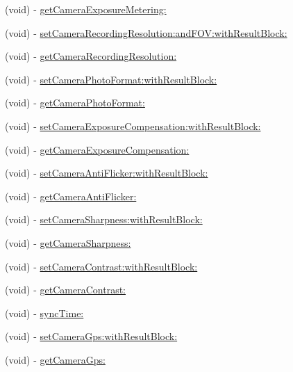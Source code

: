 \begin{DoxyCompactItemize}
\item 
(void) -\/ \hyperlink{interface_d_j_i_camera_a2bf7db98f17444eb1237a3e15876dbc9}{get\+Camera\+Exposure\+Metering\+:}
\item 
(void) -\/ \hyperlink{interface_d_j_i_camera_ab31e7fceb02ab8297592c0237178c124}{set\+Camera\+Recording\+Resolution\+:and\+F\+O\+V\+:with\+Result\+Block\+:}
\item 
(void) -\/ \hyperlink{interface_d_j_i_camera_abf7a4e534fca76520b6b7723b267b33c}{get\+Camera\+Recording\+Resolution\+:}
\item 
(void) -\/ \hyperlink{interface_d_j_i_camera_a866646cab142e602d5c41074c7931b26}{set\+Camera\+Photo\+Format\+:with\+Result\+Block\+:}
\item 
(void) -\/ \hyperlink{interface_d_j_i_camera_aacb8e2260944d9bc5d02840dbd98952f}{get\+Camera\+Photo\+Format\+:}
\item 
(void) -\/ \hyperlink{interface_d_j_i_camera_a6755ae71cfba5edd7ead0132d2e8b32a}{set\+Camera\+Exposure\+Compensation\+:with\+Result\+Block\+:}
\item 
(void) -\/ \hyperlink{interface_d_j_i_camera_a8ac02ef272b0748ae0b9ba0606cf1ff5}{get\+Camera\+Exposure\+Compensation\+:}
\item 
(void) -\/ \hyperlink{interface_d_j_i_camera_a6de121d0c2f5380a3f981ab58fd3d039}{set\+Camera\+Anti\+Flicker\+:with\+Result\+Block\+:}
\item 
(void) -\/ \hyperlink{interface_d_j_i_camera_a8a10b5f222f52ab4a567f9daaa66c01b}{get\+Camera\+Anti\+Flicker\+:}
\item 
(void) -\/ \hyperlink{interface_d_j_i_camera_a3e12cf84035bd62ed1ed0c8b631744b0}{set\+Camera\+Sharpness\+:with\+Result\+Block\+:}
\item 
(void) -\/ \hyperlink{interface_d_j_i_camera_ac66a941aa97f5759b6edbeed63ed2651}{get\+Camera\+Sharpness\+:}
\item 
(void) -\/ \hyperlink{interface_d_j_i_camera_a0f6dc6fba1427b888eef36be70d3a66b}{set\+Camera\+Contrast\+:with\+Result\+Block\+:}
\item 
(void) -\/ \hyperlink{interface_d_j_i_camera_a808873449e7ee9d0cd934717c8da5d56}{get\+Camera\+Contrast\+:}
\item 
(void) -\/ \hyperlink{interface_d_j_i_camera_a859dae115d90d5a76b9bb20ff7472ad3}{sync\+Time\+:}
\item 
(void) -\/ \hyperlink{interface_d_j_i_camera_ab82f5dd8ff7436ff1854e87b8d98dd32}{set\+Camera\+Gps\+:with\+Result\+Block\+:}
\item 
(void) -\/ \hyperlink{interface_d_j_i_camera_a12ea90b2078c79e442b737367f174d69}{get\+Camera\+Gps\+:}

\end{DoxyCompactItemize}
